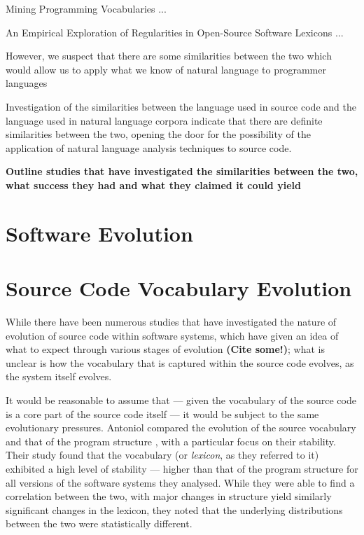 Mining Programming Vocabularies ... \cite{Delorey09a}

An Empirical Exploration of Regularities in Open-Source Software Lexicons ...\cite{Pierret09a}

However, we suspect that there are some similarities between the two which would allow us to apply what we know of natural language to programmer languages
 
Investigation of the similarities between the language used in source code and the language used in natural language corpora indicate that there are definite similarities between the two, opening the door for the possibility of the application of natural language analysis techniques to source code.

\textbf{Outline studies that have investigated the similarities between the two, what success they had and what they claimed it could yield}


\section{Software Evolution} %
\label{sec:software_evolution}


\section{Source Code Vocabulary Evolution} %
\label{sec:source_code_vocabulary_evolution}

While there have been numerous studies that have investigated the nature of evolution of source code within software systems, which have given an idea of what to expect through various stages of evolution \textbf{(Cite some!)}; what is unclear is how the vocabulary that is captured within the source code evolves, as the system itself evolves.

It would be reasonable to assume that --- given the vocabulary of the source code is a core part of the source code itself --- it would be subject to the same evolutionary pressures. Antoniol \etal compared the evolution of the source vocabulary and that of the program structure \cite{Antoniol07a}, with a particular focus on their stability. Their study found that the vocabulary (or \emph{lexicon}, as they referred to it) exhibited a high level of stability --- higher than that of the program structure for all versions of the software systems they analysed. While they were able to find a correlation between the two, with major changes in structure yield similarly significant changes in the lexicon, they noted that the underlying distributions between the two were statistically different.

